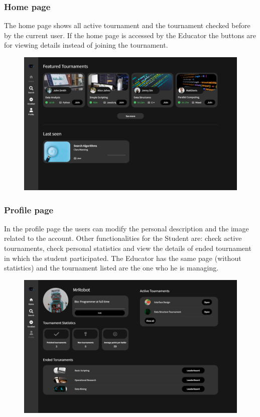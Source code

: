 \documentclass[12pt, a4paper]{report}
\begin{document}
    \subsubsection{Home page} 
    The home page shows all active tournament and the tournament checked before by the current user. 
    If the home page is accessed by the Educator the buttons are for viewing details instead of joining the tournament. 
    \begin{figure}[H]
        \centering
        \includegraphics[width=0.8\linewidth]{images/home.png}
    \end{figure}

    \subsubsection{Profile page} 
    In the profile page the users can modify the personal description and the image related to the account. 
    Other functionalities for the Student are: check active tournaments, check personal statistics and view the details of ended tournament in which the student participated.
    The Educator has the same page (without statistics) and the tournament listed are the one who he is managing. 
    \begin{figure}[H]
        \centering
        \includegraphics[width=0.8\linewidth]{images/profilepage.png}
    \end{figure}
\end{document}

